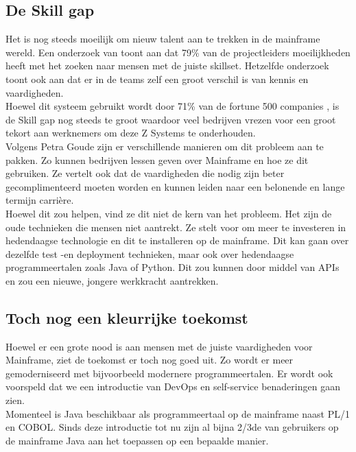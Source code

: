 \subsection{De Skill gap}
Het is nog steeds moeilijk om nieuw talent aan te trekken in de mainframe wereld. Een onderzoek van \textcite{Deloitte2020} toont aan dat 79\% van de projectleiders moeilijkheden heeft met het zoeken naar mensen met de juiste skillset. Hetzelfde onderzoek toont ook aan dat er in de teams zelf een groot verschil is van kennis en vaardigheden.  \\ Hoewel dit systeem gebruikt wordt door 71\% van de fortune 500 companies \autocite{Tozzi2022} , is de Skill gap nog steeds te groot waardoor veel bedrijven vrezen voor een groot tekort aan werknemers om deze Z Systems te onderhouden.
\\
Volgens Petra Goude zijn er verschillende manieren om dit probleem aan te pakken. Zo kunnen bedrijven lessen geven over Mainframe en hoe ze dit gebruiken. Ze vertelt ook dat de vaardigheden die nodig zijn beter gecomplimenteerd moeten worden en kunnen leiden naar een belonende en lange termijn carrière. \\ Hoewel dit zou helpen, vind ze dit niet de kern van het probleem. Het zijn de oude technieken die mensen niet aantrekt. Ze stelt voor om meer te investeren in hedendaagse technologie en dit te installeren op de mainframe. Dit kan gaan over dezelfde test -en deployment technieken, maar ook over hedendaagse programmeertalen zoals Java of Python. Dit zou kunnen door middel van APIs en zou een nieuwe, jongere werkkracht aantrekken. \autocite{Goude2023}


\subsection{Toch nog een kleurrijke toekomst}
Hoewel er een grote nood is aan mensen met de juiste vaardigheden voor Mainframe, ziet de toekomst er toch nog goed uit. Zo wordt er meer gemoderniseerd met bijvoorbeeld modernere programmeertalen. Er wordt ook voorspeld dat we een introductie van DevOps en self-service benaderingen gaan zien. \autocite{Pennaz2023} \\
Momenteel is Java beschikbaar als programmeertaal op de mainframe naast PL/1 en COBOL.
Sinds deze introductie tot nu zijn al bijna 2/3de van gebruikers op de mainframe Java aan het toepassen op een bepaalde manier. \autocite{Watts2018}




